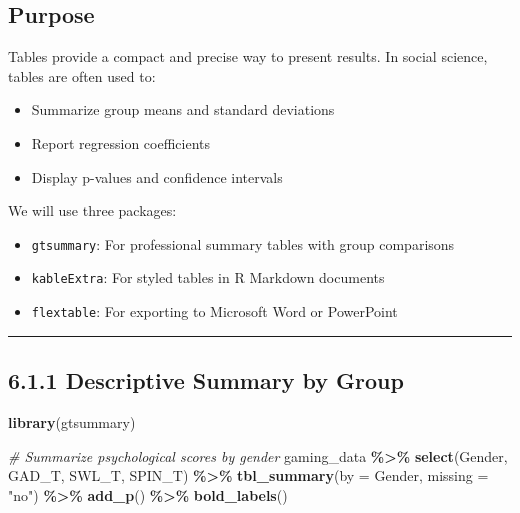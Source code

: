 \documentclass[
]{book}
\newenvironment{Shaded}{\begin{snugshade}}{\end{snugshade}}
\newcommand{\AttributeTok}[1]{\textcolor[rgb]{0.13,0.29,0.53}{#1}}
\newcommand{\CommentTok}[1]{\textcolor[rgb]{0.56,0.35,0.01}{\textit{#1}}}
\newcommand{\FunctionTok}[1]{\textcolor[rgb]{0.13,0.29,0.53}{\textbf{#1}}}
\newcommand{\NormalTok}[1]{#1}
\newcommand{\SpecialCharTok}[1]{\textcolor[rgb]{0.81,0.36,0.00}{\textbf{#1}}}
\newcommand{\StringTok}[1]{\textcolor[rgb]{0.31,0.60,0.02}{#1}}
\providecommand{\tightlist}{%
  \setlength{\itemsep}{0pt}\setlength{\parskip}{0pt}}
\begin{document}
\subsection{Purpose}\label{purpose-4}

Tables provide a compact and precise way to present results. In social science, tables are often used to:

\begin{itemize}
\tightlist
\item
  Summarize group means and standard deviations
\item
  Report regression coefficients
\item
  Display p-values and confidence intervals
\end{itemize}

We will use three packages:

\begin{itemize}
\tightlist
\item
  \texttt{gtsummary}: For professional summary tables with group comparisons
\item
  \texttt{kableExtra}: For styled tables in R Markdown documents
\item
  \texttt{flextable}: For exporting to Microsoft Word or PowerPoint
\end{itemize}

\begin{center}\rule{0.5\linewidth}{0.5pt}\end{center}

\subsection{6.1.1 Descriptive Summary by Group}\label{descriptive-summary-by-group}

\begin{Shaded}
\begin{Highlighting}[]
\FunctionTok{library}\NormalTok{(gtsummary)}

\CommentTok{\# Summarize psychological scores by gender}
\NormalTok{gaming\_data }\SpecialCharTok{\%\textgreater{}\%}
  \FunctionTok{select}\NormalTok{(Gender, GAD\_T, SWL\_T, SPIN\_T) }\SpecialCharTok{\%\textgreater{}\%}
  \FunctionTok{tbl\_summary}\NormalTok{(}\AttributeTok{by =}\NormalTok{ Gender, }\AttributeTok{missing =} \StringTok{"no"}\NormalTok{) }\SpecialCharTok{\%\textgreater{}\%}
  \FunctionTok{add\_p}\NormalTok{() }\SpecialCharTok{\%\textgreater{}\%}
  \FunctionTok{bold\_labels}\NormalTok{()}
\end{Highlighting}
\end{Shaded}
\end{document}

